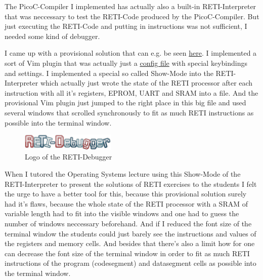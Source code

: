 \documentclass{report}
\begin{document}
The PicoC-Compiler I implemented has actually also a built-in \alert{RETI-Interpreter} that was neccessary to test the RETI-Code produced by the PicoC-Compiler. But just executing the RETI-Code and putting in  instructions was not sufficient, I needed some kind of debugger.

I came up with a provisional solution that can e.g. be seen \href{https://asciinema.org/a/526542}{here}. I implemented a sort of Vim plugin that was actually just a \href{https://github.com/matthejue/PicoC-Compiler/blob/master/src/interpr_showcase.vim}{config file} with special keybindings and settings. I implemented a special so called \alert{Show-Mode} into the RETI-Interpreter which actually just wrote the state of the RETI processor after each instruction with all it's registers, EPROM, UART and SRAM into a file. And the provisional Vim plugin just jumped to the right place in this big file and used several windows that scrolled synchronously to fit as much RETI instructions as possible into the terminal window.

\begin{figure}
	\centering
	\includegraphics[width=0.4\textwidth]{./figures/reti-debugger.png}
	\caption{Logo of the RETI-Debugger}
	\label{fig:logo of the reti debugger}
  \vspace{0.25cm}
\end{figure}


When I tutored the Operating Systems lecture using this \alert{Show-Mode} of the RETI-Interpreter to present the solutions of RETI exercises to the students I felt the urge to have a better tool for this, because this provisional solution surely had it's flaws, because the whole state of the RETI processor with a SRAM of variable length had to fit into the visible windows and one had to guess the number of windows neccessary beforehand. And if I reduced the font size of the terminal window the students could just barely see the instructions and values of the registers and memory cells. And besides that there's also a limit how for one can decrease the font size of the terminal window in order to fit as much RETI instructions of the program (codesegment) and datasegment cells as possible into the terminal window.
\end{document}
